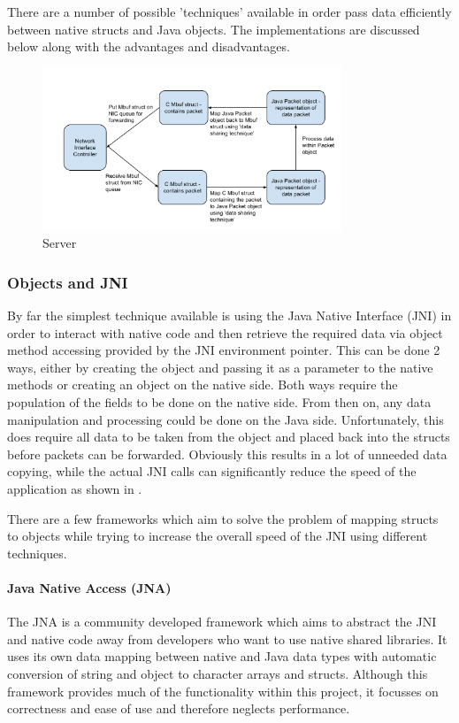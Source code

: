 \documentclass[final_report.tex]{subfiles}
\begin{document}
There are a number of possible 'techniques' available in order pass data efficiently between native structs and Java objects. The implementations are discussed below along with the advantages and disadvantages.

\begin{figure}[H]
	\centering
	\includegraphics[width=0.8\textwidth]{img/pipeline.png}
	\caption{Server}
	\label{fig:pipeline}
\end{figure}

\subsubsection{Objects and JNI}
By far the simplest technique available is using the Java Native Interface (JNI) in order to interact with native code and then retrieve the required data via object method accessing provided by the JNI environment pointer. This can be done 2 ways, either by creating the object and passing it as a parameter to the native methods or creating an object on the native side. Both ways require the population of the fields to be done on the native side. From then on, any data manipulation and processing could be done on the Java side. Unfortunately, this does require all data to be taken from the object and placed back into the structs before packets can be forwarded. Obviously this results in a lot of unneeded data copying, while the actual JNI calls can significantly reduce the speed of the application as shown in .

There are a few frameworks which aim to solve the problem of mapping structs to objects while trying to increase the overall speed of the JNI using different techniques.

\paragraph*{Java Native Access (JNA)}
The JNA is a community developed framework which aims to abstract the JNI and native code away from developers who want to use native shared libraries. It uses its own data mapping between native and Java data types with automatic conversion of string and object to character arrays and structs. Although this framework provides much of the functionality within this project, it focusses on correctness and ease of use and therefore neglects performance.
\end{document}

